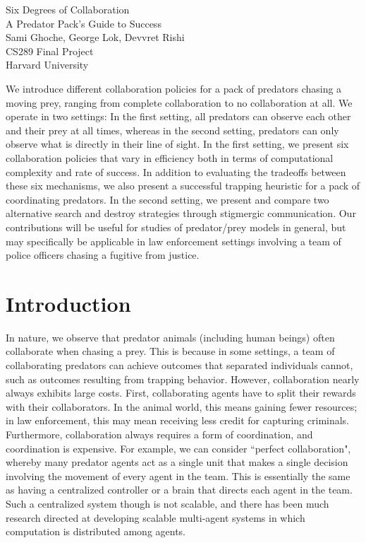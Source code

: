 \documentclass[11pt]{article}
\renewenvironment{abstract}
 {\small
  \begin{center}
  \bfseries \abstractname\vspace{-.5em}\vspace{0pt}
  \end{center}
  \list{}{%
    \setlength{\leftmargin}{0in}%
    \setlength{\rightmargin}{\leftmargin}%
  }%
  \item\relax}
 {\endlist}
\begin{document}
{
\vspace*{25px}
 \centering
 \LARGE Six Degrees of Collaboration \\ A Predator Pack's Guide to Success \\[1.5em]
 \large Sami Ghoche,
        George Lok,
        Devvret Rishi\\[1em]

        
	CS289 Final Project\\
	
	Harvard University
	
\vspace{75px}
}

\begin{abstract}

We introduce different collaboration policies for a pack of predators chasing a moving prey, ranging from complete collaboration to no collaboration at all. We operate in two settings: In the first setting, all predators can observe each other and their prey at all times, whereas in the second setting, predators can only observe what is directly in their line of sight. In the first setting, we present six collaboration policies that vary in efficiency both in terms of computational complexity and rate of success. In addition to evaluating the tradeoffs between these six mechanisms, we also present a successful trapping heuristic for a pack of coordinating predators. In the second setting, we present and compare two alternative search and destroy strategies through stigmergic communication. Our contributions will be useful for studies of predator/prey models in general, but may specifically be applicable in law enforcement settings involving a team of police officers chasing a fugitive from justice. 

\end{abstract}

\section{Introduction}
In nature, we observe that predator animals (including human beings) often collaborate when chasing a prey. This is because in some settings, a team of collaborating predators can achieve outcomes that separated individuals cannot, such as outcomes resulting from trapping behavior. However, collaboration nearly always exhibits large costs. First, collaborating agents have to split their rewards with their collaborators. In the animal world, this means gaining fewer resources; in law enforcement, this may mean receiving less credit for capturing criminals. Furthermore, collaboration always requires a form of coordination, and coordination is expensive. For example, we can consider ``perfect collaboration", whereby many predator agents act as a single unit that makes a single decision involving the movement of every agent in the team. This is essentially the same as having a centralized controller or a brain that directs each agent in the team. Such a centralized system though is not scalable, and there has been much research directed at developing scalable multi-agent systems in which computation is distributed among agents. 
\end{document}
